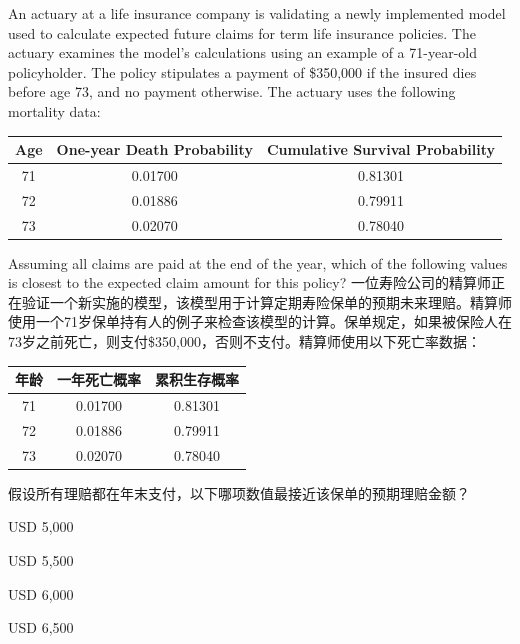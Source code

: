 \documentclass{article}
\newcounter{question} %
\begin{document}
\begin{question}
    An actuary at a life insurance company is validating a newly implemented model used to calculate expected future claims for term life insurance policies. The actuary examines the model's calculations using an example of a 71-year-old policyholder. The policy stipulates a payment of \$350,000 if the insured dies before age 73, and no payment otherwise. The actuary uses the following mortality data:

    \begin{center}
    \begin{tabular}{|c|c|c|}
    \hline
    Age & One-year Death Probability & Cumulative Survival Probability \\
    \hline
    71 & 0.01700 & 0.81301 \\
    72 & 0.01886 & 0.79911 \\
    73 & 0.02070 & 0.78040 \\
    \hline
    \end{tabular}
    \end{center}

    Assuming all claims are paid at the end of the year, which of the following values is closest to the expected claim amount for this policy?
    一位寿险公司的精算师正在验证一个新实施的模型，该模型用于计算定期寿险保单的预期未来理赔。精算师使用一个71岁保单持有人的例子来检查该模型的计算。保单规定，如果被保险人在73岁之前死亡，则支付\$350,000，否则不支付。精算师使用以下死亡率数据：

    \begin{center}
    \begin{tabular}{|c|c|c|}
    \hline
    年龄 & 一年死亡概率 & 累积生存概率 \\
    \hline
    71 & 0.01700 & 0.81301 \\
    72 & 0.01886 & 0.79911 \\
    73 & 0.02070 & 0.78040 \\
    \hline
    \end{tabular}
    \end{center}

    假设所有理赔都在年末支付，以下哪项数值最接近该保单的预期理赔金额？
\end{question}

\begin{choices}
    \item USD 5,000
    \item USD 5,500
    \item USD 6,000
    \item USD 6,500
\end{choices}
\end{document}
